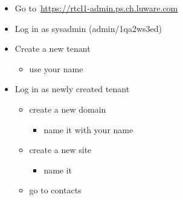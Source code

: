 \documentclass{article}
\begin{document}
\begin{itemize}[noitemsep,topsep=\mdcompacttopsep]%

\item{}Go to~\href{https://rtcl1-admin.ps.ch.luware.com}{https://rtcl1-admin.ps.ch.luware.com}%

\item{}Log in as sysadmin (admin/1qa2ws3ed)%

\item{}Create a new tenant 

\begin{itemize}[noitemsep,topsep=\mdcompacttopsep]%

\item{}use your name%
\end{itemize}%

\item{}Log in as newly created tenant

\begin{itemize}[noitemsep,topsep=\mdcompacttopsep]%

\item{}create a new domain 

\begin{itemize}[noitemsep,topsep=\mdcompacttopsep]%

\item{}name it with your name%
\end{itemize}%

\item{}create a new site 

\begin{itemize}[noitemsep,topsep=\mdcompacttopsep]%

\item{}name it%
\end{itemize}%

\item{}go to contacts

\begin{itemize}[noitemsep,topsep=\mdcompacttopsep]%


\end{itemize}
\end{itemize}
\end{itemize}
\end{document}
